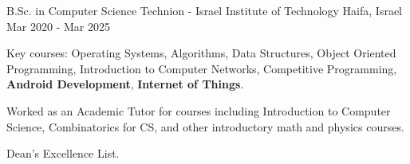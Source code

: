 
\begin{cventries}

  \cventry
    {B.Sc. in Computer Science} %
    {Technion - Israel Institute of Technology} %
    {Haifa, Israel} %
    {Mar 2020 - Mar 2025} %
    {
      \begin{cvitems} %
        \item {Key courses: Operating Systems, Algorithms, Data Structures, Object Oriented Programming, Introduction to Computer Networks, Competitive Programming, \textbf{Android Development}, \textbf{Internet of Things}.}
        \item {Worked as an Academic Tutor for courses including Introduction to Computer Science, Combinatorics for CS, and other introductory math and physics courses.}
        \item {Dean's Excellence List.}
      \end{cvitems}
    }

\end{cventries}